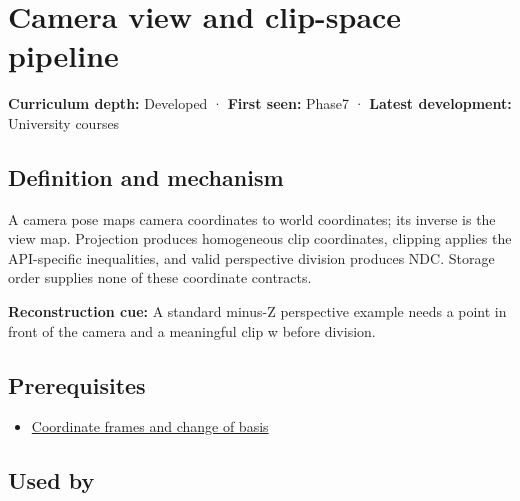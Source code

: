 \hypertarget{appendix-1c07d64f5e70}{}\label{referencestart:appendix-1c07d64f5e70}
\section{Camera view and clip-space pipeline}\label{appendix-1c07d64f5e70-camera-view-and-clip-space-pipeline}

\textbf{Curriculum depth:} Developed · \textbf{First seen:} Phase7 · \textbf{Latest development:} University courses

\subsection{Definition and mechanism}\label{appendix-1c07d64f5e70-definition-and-mechanism}

A camera pose maps camera coordinates to world coordinates; its inverse is the view map. Projection produces homogeneous clip coordinates, clipping applies the API-specific inequalities, and valid perspective division produces NDC. Storage order supplies none of these coordinate contracts.

\textbf{Reconstruction cue:} A standard minus-Z perspective example needs a point in front of the camera and a meaningful clip w before division.

\subsection{Prerequisites}\label{appendix-1c07d64f5e70-prerequisites}

\begin{itemize}
\tightlist
\item
  \hyperref[appendix-1bae9457dbc3]{Coordinate frames and change of basis}
\end{itemize}

\subsection{Used by}\label{appendix-1c07d64f5e70-used-by}

